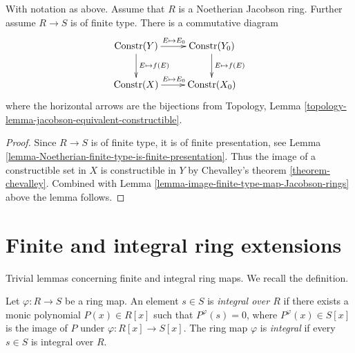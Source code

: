 \begin{lemma}
\label{lemma-conclude-jacobson-Noetherian}
With notation as above. Assume that $R$ is a Noetherian Jacobson ring.
Further assume $R \to S$ is of finite type.
There is a commutative diagram
$$
\xymatrix{
\text{Constr}(Y) \ar[r]^{E \mapsto E_0} \ar[d]^{E \mapsto f(E)} &
\text{Constr}(Y_0) \ar[d]^{E \mapsto f(E)} \cr
\text{Constr}(X) \ar[r]^{E \mapsto E_0} &
\text{Constr}(X_0)
}
$$
where the horizontal arrows are the bijections from
Topology, Lemma \ref{topology-lemma-jacobson-equivalent-constructible}.
\end{lemma}

\begin{proof}
Since $R \to S$ is of finite type, it is of finite presentation,
see Lemma \ref{lemma-Noetherian-finite-type-is-finite-presentation}.
Thus the image of a constructible set in $X$ is constructible
in $Y$ by Chevalley's theorem \ref{theorem-chevalley}. Combined with
Lemma \ref{lemma-image-finite-type-map-Jacobson-rings}
above the lemma follows.
\end{proof}






































\section{Finite and integral ring extensions}
\label{section-finite-ring-extensions}

\noindent
Trivial lemmas concerning finite and integral ring maps.
We recall the definition.

\begin{definition}
\label{definition-integral-ring-map}
Let $\varphi : R \to S$ be a ring map. An element $s \in S$
is {\it integral over $R$} if there exists a monic
polynomial $P(x) \in R[x]$ such that
$P^\varphi(s) = 0$, where $P^\varphi(x) \in S[x]$
is the image of $P$ under $\varphi : R[x] \to S[x]$.
The ring map $\varphi$ is {\it integral}
if every $s \in S$ is integral over $R$.
\end{definition}

